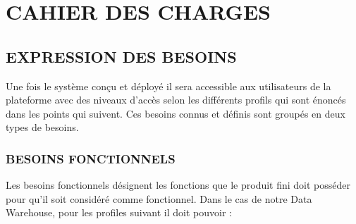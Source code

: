 \chapter{CAHIER DES CHARGES}


\section{EXPRESSION DES BESOINS}
Une fois le système conçu et déployé il sera accessible aux utilisateurs de la plateforme avec des niveaux d’accès selon les différents profils qui sont énoncés dans les points qui suivent. Ces besoins connus et définis sont groupés en deux types de besoins.


 \subsection{BESOINS FONCTIONNELS}
 
 Les besoins fonctionnels désignent les fonctions que le produit fini doit posséder pour qu’il soit considéré comme fonctionnel. Dans le cas de notre Data Warehouse, pour les profiles suivant il doit pouvoir :
 
